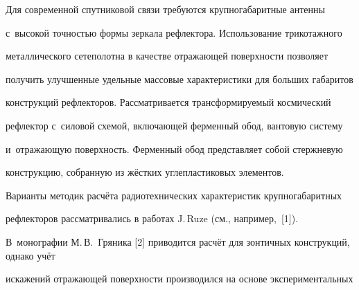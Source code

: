 





\date{29/VI/2008}







\maketitle




Для современной спутниковой связи требуются крупногабаритные антенны 

с~высокой точностью формы зеркала рефлектора. Использование трикотажного 

металлического сетеполотна в качестве отражающей поверхности позволяет 

получить улучшенные удельные массовые характеристики для больших габаритов 

конструкций рефлекторов. Рассматривается трансформируемый космический 

рефлектор с~силовой схемой, включающей ферменный обод, вантовую систему 

и~отражающую поверхность. Ферменный обод представляет собой стержневую 

конструкцию, собранную из жёстких углепластиковых элементов.



Варианты методик расчёта радиотехнических характеристик крупногабаритных 

рефлекторов рассматривались в работах J.\,Ruze (см., например,~[1]). 

В~монографии М.\,В.~Гряника [2] приводится расчёт для зонтичных конструкций, однако учёт 

искажений отражающей поверхности производился на основе экспериментальных 

